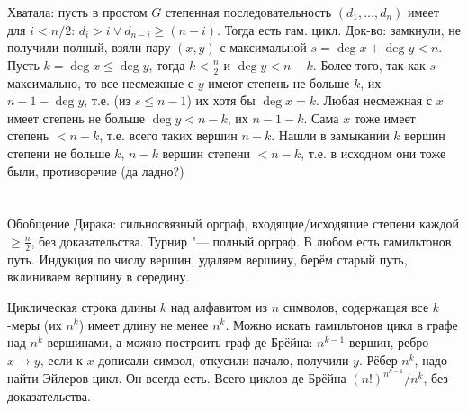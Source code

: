 Хватала: пусть в простом $G$ степенная последовательность $(d_1, \dots, d_n)$ имеет для $i<n/2$:
$d_i>i\lor d_{n-i}\ge(n-i)$.
Тогда есть гам. цикл.
Док-во: замкнули, не получили полный, взяли пару $(x, y)$ с максимальной $s=\deg x + \deg y < n$.
Пусть $k=\deg x \le \deg y$, тогда $k < \frac{n}{2}$ и $\deg y < n-k$.
Более того, так как $s$ максимально, то все несмежные с $y$ имеют степень не больше $k$,
их $n-1-\deg y$, т.е. (из $s \le n-1$) их хотя бы $\deg x = k$.
Любая несмежная с $x$ имеет степень не больше $\deg y < n-k$,
их $n-1-k$.
Сама $x$ тоже имеет степень $< n-k$, т.е. всего таких вершин $n-k$.
Нашли в замыкании $k$ вершин степени не больше $k$, $n-k$ вершин степени $<n-k$,
т.е. в исходном они тоже были, противоречие (\TODO да ладно?)

\section{} %
Обобщение Дирака: сильносвязный орграф, входящие/исходящие степени каждой $\ge \frac{n}{2}$,
без доказательства.
Турнир "--- полный орграф.
В любом есть гамильтонов путь.
Индукция по числу вершин, удаляем вершину, берём старый путь, вклиниваем вершину в середину.

Циклическая строка длины $k$ над алфавитом из $n$ символов, содержащая все
$k$-меры (их $n^k$) имеет длину не менее $n^k$.
Можно искать гамильтонов цикл в графе над $n^k$ вершинами,
а можно построить граф де Брёйна: $n^{k-1}$ вершин, ребро $x \to y$,
если к $x$ дописали символ, откусили начало, получили $y$.
Рёбер $n^k$, надо найти Эйлеров цикл.
Он всегда есть.
Всего циклов де Брёйна $(n!)^{n^{k-1}}/n^k$, без доказательства.

\section{} %
\TODO
